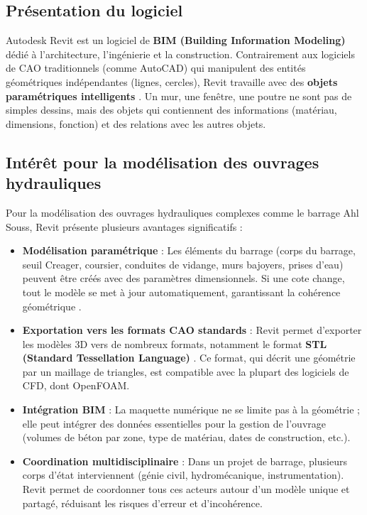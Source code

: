 \subsection{Présentation du logiciel}
\label{subsec:presentation_revit}

Autodesk Revit est un logiciel de \textbf{BIM (Building Information Modeling)} dédié à l'architecture, l'ingénierie et la construction. Contrairement aux logiciels de CAO traditionnels (comme AutoCAD) qui manipulent des entités géométriques indépendantes (lignes, cercles), Revit travaille avec des \textbf{objets paramétriques intelligents} \cite{autodesk2021revit, eastman2011bim}. Un mur, une fenêtre, une poutre ne sont pas de simples dessins, mais des objets qui contiennent des informations (matériau, dimensions, fonction) et des relations avec les autres objets.

\subsection{Intérêt pour la modélisation des ouvrages hydrauliques}
\label{subsec:interet_revit}

Pour la modélisation des ouvrages hydrauliques complexes comme le barrage Ahl Souss, Revit présente plusieurs avantages significatifs :

\begin{itemize}
    \item \textbf{Modélisation paramétrique} : Les éléments du barrage (corps du barrage, seuil Creager, coursier, conduites de vidange, murs bajoyers, prises d'eau) peuvent être créés avec des paramètres dimensionnels. Si une cote change, tout le modèle se met à jour automatiquement, garantissant la cohérence géométrique \cite{kensek2014building}.
    \item \textbf{Exportation vers les formats CAO standards} : Revit permet d'exporter les modèles 3D vers de nombreux formats, notamment le format \textbf{STL (Standard Tessellation Language)} \cite{szalapaj2005contemporary}. Ce format, qui décrit une géométrie par un maillage de triangles, est compatible avec la plupart des logiciels de CFD, dont OpenFOAM.
    \item \textbf{Intégration BIM} : La maquette numérique ne se limite pas à la géométrie ; elle peut intégrer des données essentielles pour la gestion de l'ouvrage (volumes de béton par zone, type de matériau, dates de construction, etc.).
    \item \textbf{Coordination multidisciplinaire} : Dans un projet de barrage, plusieurs corps d'état interviennent (génie civil, hydromécanique, instrumentation). Revit permet de coordonner tous ces acteurs autour d'un modèle unique et partagé, réduisant les risques d'erreur et d'incohérence.
\end{itemize}

